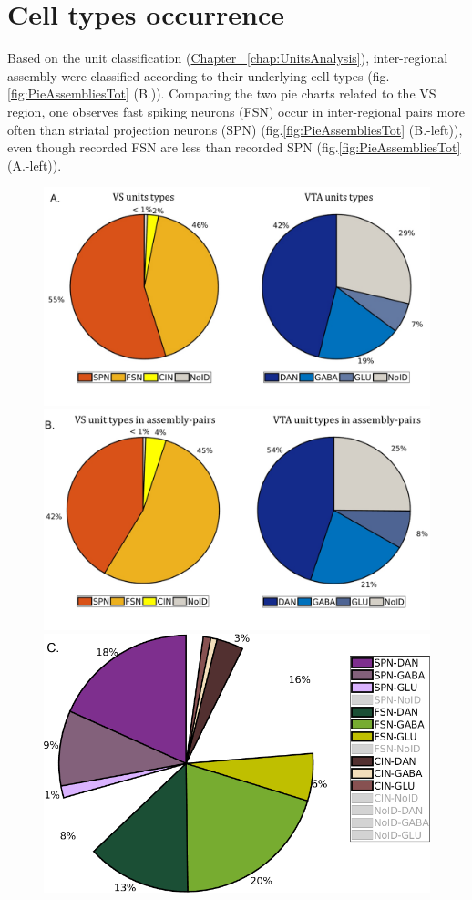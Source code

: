 \section{Cell types occurrence}
Based on the unit classification (\hyperref[chap:UnitsAnalysis]{Chapter~ \ref*{chap:UnitsAnalysis}}), inter-regional assembly were classified according to their underlying cell-types (fig.\ref{fig:PieAssembliesTot} (B.)).
Comparing the two pie charts related to the VS region, one observes fast spiking neurons (FSN) occur in inter-regional pairs more often than striatal projection neurons (SPN) (fig.\ref{fig:PieAssembliesTot} (B.-left)), even though recorded FSN are less than recorded SPN (fig.\ref{fig:PieAssembliesTot} (A.-left)).
\label{sec:CellTypesOcc}
\begin{figure}[H]
    \centering
    \includegraphics[scale=0.33]{figures/PieRegions1.pdf}
    \includegraphics[scale=0.33]{figures/PieAsNotAs.pdf}
    \includegraphics[scale=0.33]{figures/PieAssembliesTot1.png}

\end{figure}
